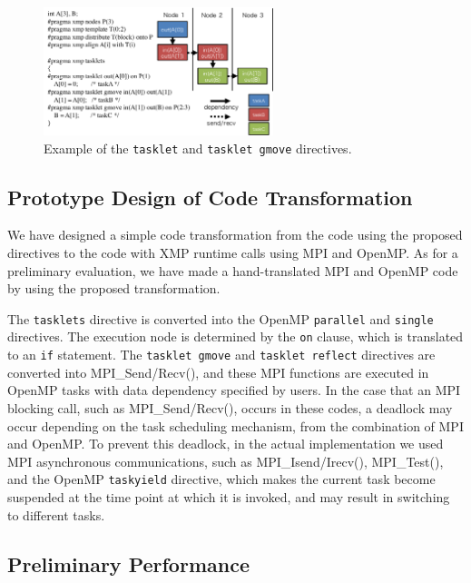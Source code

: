 ﻿\documentclass[graybox]{svmult}
\begin{document}
\begin{figure}[t]
\begin{center}
\includegraphics[bb=0 0 509 385, width=6.7cm]{./figure/FIG_TASKLET_GMOVE.pdf}
\caption{Example of the {\tt tasklet} and {\tt tasklet gmove} directives.}
\label{FIG_TASKLET_GMOVE}
\end{center}
\end{figure}


\subsection{Prototype Design of Code Transformation} \label{SEC_CODE_TRANSLATION}

We have designed a simple code transformation from the code using the proposed directives to the code with XMP runtime calls using MPI and OpenMP. 
As for a preliminary evaluation, we have made a hand-translated MPI and OpenMP code by using the proposed transformation.

The {\tt tasklets} directive is converted into the OpenMP {\tt parallel} and {\tt single} directives. The execution node is determined by the {\tt on} clause, which is translated to an {\tt if} statement. The {\tt tasklet gmove} and {\tt tasklet reflect} directives are converted into MPI\_Send/Recv(), and these MPI functions are executed in OpenMP tasks with data dependency specified by users.
In the case that an MPI blocking call, such as MPI\_Send/Recv(), occurs in these codes, a deadlock may occur depending on the task scheduling mechanism, from the combination of MPI and OpenMP. To prevent this deadlock, in the actual implementation we used MPI asynchronous communications, such as MPI\_Isend/Irecv(), MPI\_Test(), and the OpenMP {\tt taskyield} directive, which makes the current task become suspended at the time point at which it is invoked, and may result in switching to different tasks.

\subsection{Preliminary Performance} \label{SEC4}
\end{document}
